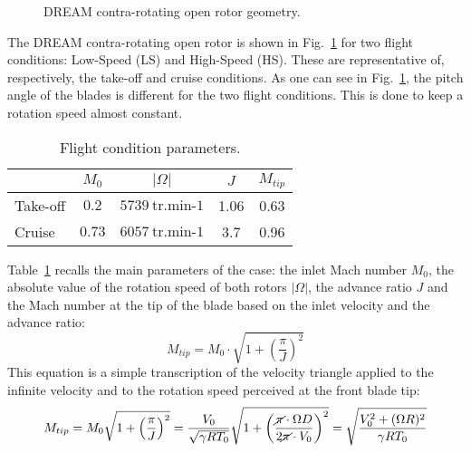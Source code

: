 

\begin{figure}[htb]
  \centering
  \caption{DREAM contra-rotating open rotor geometry.}
  \label{fig:dream_wall}
\end{figure}

The DREAM contra-rotating open rotor is shown in Fig.~\ref{fig:dream_wall}
for two flight conditions: Low-Speed (LS) and High-Speed (HS).
These are representative of, respectively, the take-off and
cruise conditions. As one can see in Fig.~\ref{fig:dream_wall},
the pitch angle of the blades is different for the two flight conditions.
This is done to keep a rotation speed almost constant.
\begin{table}[htbp]
   \centering
  \begin{tabular}{lcccc}
    \toprule
    \phantom{abdefghijk}& $M_0$ & $|\Omega|$ & $J$ & $M_{tip}$ \\
    \midrule
    Take-off & $0.2$ & $5739~\textrm{tr.min-1}$ & 1.06 & 0.63 \\
    Cruise & $0.73$ & $6057~\textrm{tr.min-1}$ & 3.7 & 0.96  \\
    \bottomrule
  \end{tabular}
  \caption{Flight condition parameters.}
  \label{tab:dream_flight_condition}
\end{table} 
Table~\ref{tab:dream_flight_condition} recalls the main
parameters of the case: the inlet Mach number $M_0$,
the absolute value of the rotation speed of both rotors $|\Omega|$,
the advance ratio $J$ and the Mach number at the tip of
the blade based on the inlet velocity and the advance ratio:
\begin{equation}
	M_{tip} = M_0 \cdot \sqrt{1 + \left(\frac{\pi}{J} \right)^2}
\end{equation}
This equation is a simple transcription of the velocity triangle
applied to the infinite velocity and to the rotation speed perceived
at the front blade tip:
\begin{equation}
    M_{tip} = M_0 \sqrt{1 + \left(\frac{\pi}{J}\right)^2} = 
    \frac{V_0}{\sqrt{\gamma R T_0}} \sqrt{1 + \left(\frac{
    	\cancel{\pi} \cdot \Omega D}{
    	2 \cancel{\pi} \cdot V_0}\right)^2} =
    \sqrt{\frac{V_0^2 + (\Omega R)^2}{\gamma R T_0}}
    \label{eq:m_tip_explained}
\end{equation}
